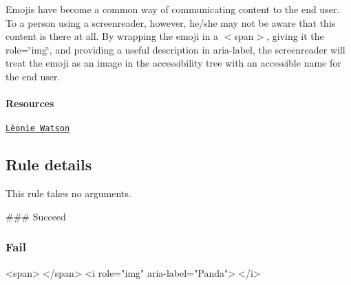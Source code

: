 Emojis have become a common way of communicating content to the end user. To a person using a screenreader, however, he/she may not be aware that this content is there at all. By wrapping the emoji in a {\ttfamily $<$span$>$}, giving it the {\ttfamily role=\char`\"{}img\char`\"{}}, and providing a useful description in {\ttfamily aria-\/label}, the screenreader will treat the emoji as an image in the accessibility tree with an accessible name for the end user.

\paragraph*{Resources}


\begin{DoxyEnumerate}
\item \href{http://tink.uk/accessible-emoji/}{\tt Lèonie Watson}
\end{DoxyEnumerate}

\subsection*{Rule details}

This rule takes no arguments.

\#\#\# Succeed 


\subsubsection*{Fail}


\begin{DoxyCode}
<span>🐼</span>
<i role="img" aria-label="Panda">🐼</i>
\end{DoxyCode}
 